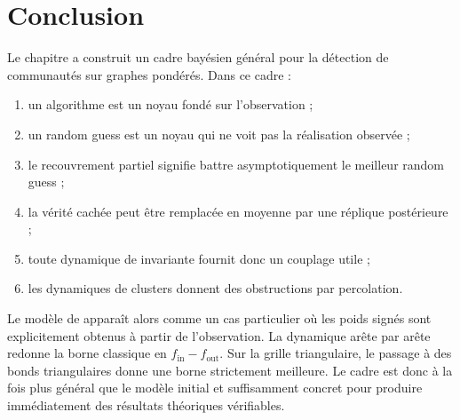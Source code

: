 \section{Conclusion}
\label{sec:chapII_conclusion}

Le chapitre a construit un cadre bayésien général pour la détection de communautés sur graphes pondérés. Dans ce cadre :
\begin{enumerate}
    \item un algorithme est un noyau fondé sur l'observation ;
    \item un random guess est un noyau qui ne voit pas la réalisation observée ;
    \item le recouvrement partiel signifie battre asymptotiquement le meilleur random guess ;
    \item la vérité cachée peut être remplacée en moyenne par une réplique postérieure ;
    \item toute dynamique de  invariante fournit donc un couplage utile ;
    \item les dynamiques de clusters donnent des obstructions par percolation.
\end{enumerate}

Le modèle de \SB{} apparaît alors comme un cas particulier où les poids signés sont explicitement obtenus à partir de l'observation. La dynamique \SW{} arête par arête redonne la borne classique en $f_{\mathrm{in}}-f_{\mathrm{out}}$. Sur la grille triangulaire, le passage à des bonds triangulaires donne une borne strictement meilleure. Le cadre est donc à la fois plus général que le modèle initial et suffisamment concret pour produire immédiatement des résultats théoriques vérifiables.
